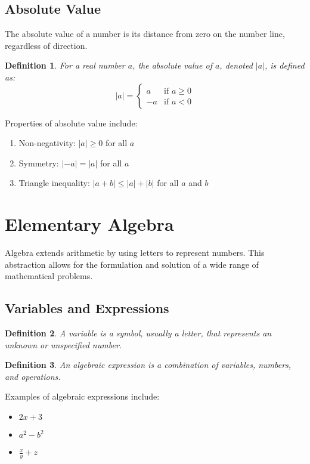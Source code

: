 \documentclass[12pt,a4paper]{article}
\newtheorem{definition}{Definition}
\begin{document}
\subsection{Absolute Value}

The absolute value of a number is its distance from zero on the number line, regardless of direction.

\begin{definition}
For a real number $a$, the absolute value of $a$, denoted $|a|$, is defined as:
\[ |a| = \begin{cases} 
      a & \text{if } a \geq 0 \\
      -a & \text{if } a < 0 
   \end{cases}
\]
\end{definition}

Properties of absolute value include:

\begin{enumerate}
    \item Non-negativity: $|a| \geq 0$ for all $a$
    \item Symmetry: $|-a| = |a|$ for all $a$
    \item Triangle inequality: $|a + b| \leq |a| + |b|$ for all $a$ and $b$
\end{enumerate}

\section{Elementary Algebra}

Algebra extends arithmetic by using letters to represent numbers. This abstraction allows for the formulation and solution of a wide range of mathematical problems.

\subsection{Variables and Expressions}

\begin{definition}
A variable is a symbol, usually a letter, that represents an unknown or unspecified number.
\end{definition}

\begin{definition}
An algebraic expression is a combination of variables, numbers, and operations.
\end{definition}

Examples of algebraic expressions include:
\begin{itemize}
    \item $2x + 3$
    \item $a^2 - b^2$
    \item $\frac{x}{y} + z$
\end{itemize}
\end{document}
